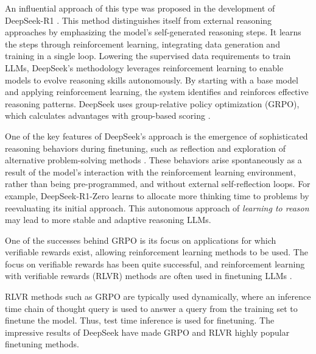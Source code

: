 An influential approach of this type was proposed  in the development of DeepSeek-R1 \cite{guo2025deepseek}. This method distinguishes itself from  external reasoning approaches by emphasizing the model's self-generated reasoning steps. It learns the steps through  reinforcement learning, integrating data generation and training in a single loop. %
Lowering the supervised data requirements to train LLMs, 
DeepSeek's methodology leverages reinforcement learning to enable models %
to evolve reasoning skills autonomously. By starting with a base model and applying reinforcement learning, the system identifies and reinforces effective reasoning patterns. DeepSeek uses group-relative policy optimization (GRPO), which  %
calculates advantages with
group-based scoring \citep{shao2024deepseekmath}. %

One of the key features of DeepSeek's approach is the emergence of sophisticated reasoning behaviors during finetuning, such as reflection and exploration of alternative problem-solving methods \citep{mercer2025brief}. These behaviors arise spontaneously as a result of the model's interaction with the reinforcement learning environment, rather than being pre-programmed, and without external self-reflection loops. For example, DeepSeek-R1-Zero learns to allocate more thinking time to problems by reevaluating its initial approach.
This autonomous approach of {\em learning to reason} may lead to more stable and adaptive reasoning LLMs. 



One of the successes behind GRPO is its focus on applications for which  verifiable rewards exist, allowing reinforcement learning methods to be used. The focus on verifiable rewards has been quite successful, and  reinforcement learning with verifiable rewards (RLVR) methods are often used in finetuning LLMs  \citep{lambert2024tulu}.



RLVR methods such as GRPO are typically used dynamically, where an inference time chain of thought query is used to answer a query from the training set to finetune the model. Thus, test time inference is used for finetuning.
%
The impressive results of DeepSeek \citep{guo2025deepseek} have made GRPO \citep{shao2024deepseekmath} and RLVR \citep{lambert2024tulu,guo2025deepseek,wen2025reinforcement,yue2025does}  highly popular finetuning methods.

